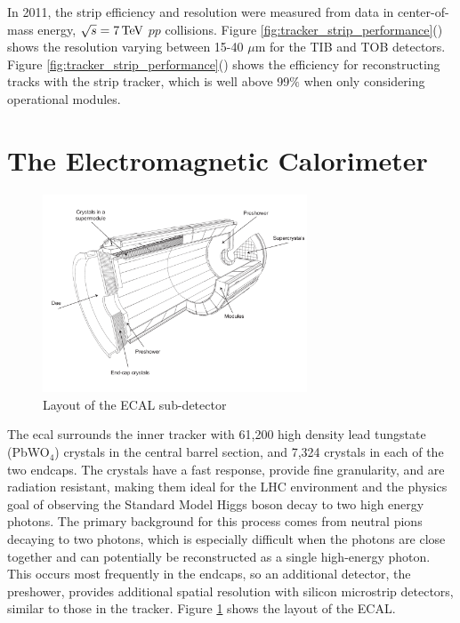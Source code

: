 \par In 2011, the strip efficiency and resolution were measured from data
in center-of-mass energy, $\sqrt{s}=7 \,\text{Te\hspace{-.08em}V}$ $pp$ collisions.  Figure
\ref{fig:tracker_strip_performance}()
shows the resolution varying between 15-40 $\mu$m for the TIB and TOB
detectors.  Figure
\ref{fig:tracker_strip_performance}()
shows the efficiency for reconstructing tracks with the strip tracker,
which is well above 99$\%$ when only considering operational modules.   


\section{The Electromagnetic Calorimeter}
\label{ecal_description}

\begin{figure}[h]
   \centering
  \includegraphics[width=0.7\textwidth]{Figures/CMS_Diagrams/ECAL__Layout.pdf}
  \caption{Layout of the ECAL sub-detector} \label{fig:ecal_layout}
\end{figure}

\par The \acrfull{ecal} surrounds the inner tracker with 61,200 high
density lead tungstate (PbWO$_{4}$) crystals in the central barrel
section, and 7,324 crystals in each of the two endcaps.  The crystals
have a fast response, provide fine granularity, and are radiation
resistant, making them ideal for the LHC environment and the physics
goal of observing the Standard Model Higgs boson decay to two high
energy photons.  The primary background for this process comes
from neutral pions decaying to two photons, which is especially
difficult when the photons are close together and can potentially be
reconstructed as a single high-energy photon.  This occurs most
frequently in the endcaps, so an additional detector, the preshower,
provides additional spatial resolution with silicon microstrip
detectors, similar to those in the tracker. Figure
\ref{fig:ecal_layout} shows the layout of the ECAL.  

